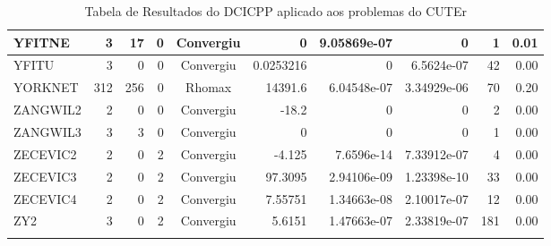 \begin{center}
\begin{longtable}{|l|r|r|r|c|r|r|r|r|r|}
  YFITNE &      3 &     17 &      0 & Convergiu  &           0 &    9.05869e-07 &           0 &      1 &    0.01 \\ \hline
   YFITU &      3 &      0 &      0 & Convergiu  &   0.0253216 &              0 &  6.5624e-07 &     42 &    0.00 \\ \hline
 YORKNET &    312 &    256 &      0 & Rhomax     &     14391.6 &    6.04548e-07 & 3.34929e-06 &     70 &    0.20 \\ \hline
ZANGWIL2 &      2 &      0 &      0 & Convergiu  &       -18.2 &              0 &           0 &      2 &    0.00 \\ \hline
ZANGWIL3 &      3 &      3 &      0 & Convergiu  &           0 &              0 &           0 &      1 &    0.00 \\ \hline
ZECEVIC2 &      2 &      0 &      2 & Convergiu  &      -4.125 &     7.6596e-14 & 7.33912e-07 &      4 &    0.00 \\ \hline
ZECEVIC3 &      2 &      0 &      2 & Convergiu  &     97.3095 &    2.94106e-09 & 1.23398e-10 &     33 &    0.00 \\ \hline
ZECEVIC4 &      2 &      0 &      2 & Convergiu  &     7.55751 &    1.34663e-08 & 2.10017e-07 &     12 &    0.00 \\ \hline
     ZY2 &      3 &      0 &      2 & Convergiu  &      5.6151 &    1.47663e-07 & 2.33819e-07 &    181 &    0.00 \\ \hline
\caption{Tabela de Resultados do DCICPP aplicado aos problemas do CUTEr}
\end{longtable}
\end{center}
